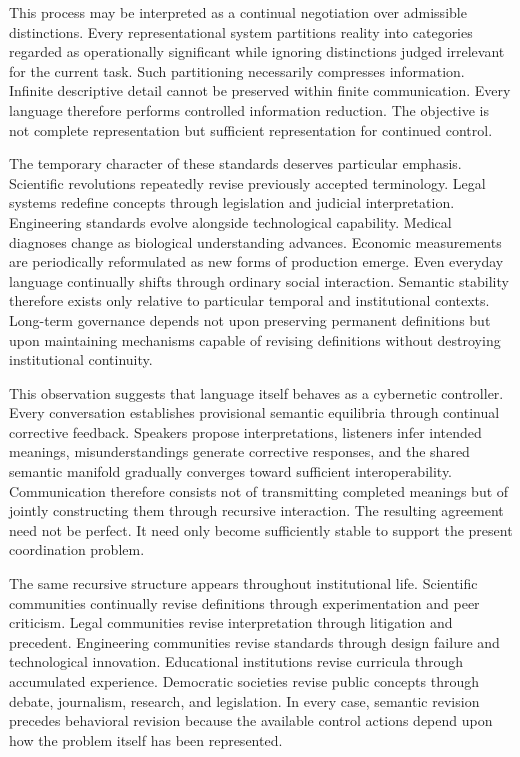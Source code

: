 \documentclass[12pt,a4paper]{article}
\begin{document}
This process may be interpreted as a continual negotiation over admissible distinctions. Every representational system partitions reality into categories regarded as operationally significant while ignoring distinctions judged irrelevant for the current task. Such partitioning necessarily compresses information. Infinite descriptive detail cannot be preserved within finite communication. Every language therefore performs controlled information reduction. The objective is not complete representation but sufficient representation for continued control.

The temporary character of these standards deserves particular emphasis. Scientific revolutions repeatedly revise previously accepted terminology. Legal systems redefine concepts through legislation and judicial interpretation. Engineering standards evolve alongside technological capability. Medical diagnoses change as biological understanding advances. Economic measurements are periodically reformulated as new forms of production emerge. Even everyday language continually shifts through ordinary social interaction. Semantic stability therefore exists only relative to particular temporal and institutional contexts. Long-term governance depends not upon preserving permanent definitions but upon maintaining mechanisms capable of revising definitions without destroying institutional continuity.

This observation suggests that language itself behaves as a cybernetic controller. Every conversation establishes provisional semantic equilibria through continual corrective feedback. Speakers propose interpretations, listeners infer intended meanings, misunderstandings generate corrective responses, and the shared semantic manifold gradually converges toward sufficient interoperability. Communication therefore consists not of transmitting completed meanings but of jointly constructing them through recursive interaction. The resulting agreement need not be perfect. It need only become sufficiently stable to support the present coordination problem.

The same recursive structure appears throughout institutional life. Scientific communities continually revise definitions through experimentation and peer criticism. Legal communities revise interpretation through litigation and precedent. Engineering communities revise standards through design failure and technological innovation. Educational institutions revise curricula through accumulated experience. Democratic societies revise public concepts through debate, journalism, research, and legislation. In every case, semantic revision precedes behavioral revision because the available control actions depend upon how the problem itself has been represented.
\end{document}
